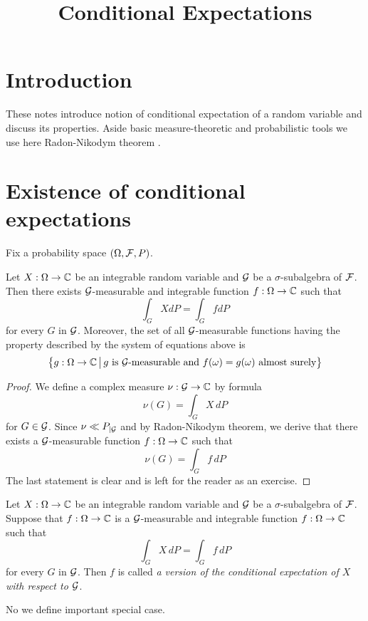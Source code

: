 



\title{Conditional Expectations}
\date{}
\maketitle
\section{Introduction}
These notes introduce notion of conditional expectation of a random variable and discuss its properties. Aside basic measure-theoretic and probabilistic tools we use here Radon-Nikodym theorem {\cite[Theorem 5.1]{Radon_Nikodym_Hahn_Jordan_Lebesgue_decomposition}}.

\section{Existence of conditional expectations}
\noindent
Fix a probability space $(\Omega, {\mathcal F}, P)$.

\begin{theorem}\label{theorem:existenceofconditionalexpectationforintegrable}
Let $X:\Omega \rightarrow {\mathbb C}$ be an integrable random variable and ${\mathcal G}$ be a $\sigma$-subalgebra of ${\mathcal F}$. Then there exists ${\mathcal G}$-measurable and integrable function $f:\Omega \rightarrow {\mathbb C}$ such that
$$\int_GXdP = \int_G f dP$$
for every $G$ in ${\mathcal G}$. Moreover, the set of all ${\mathcal G}$-measurable functions having the property described by the system of equations above is
$$\big\{g:\Omega \rightarrow {\mathbb C}\,\big|\,g\mbox{ is }{\mathcal G}\mbox{-measurable and }f(\omega)=g(\omega)\mbox{ almost surely}\big\}$$
\end{theorem}
\begin{proof}
We define a complex measure $\nu:{\mathcal G}\rightarrow {\mathbb C}$ by formula
$$\nu(G) = \int_G X\,dP$$
for $G\in {\mathcal G}$. Since $\nu \ll P_{\mid {\mathcal G}}$ and by Radon-Nikodym theorem, we derive that there exists a ${\mathcal G}$-measurable function $f:\Omega \rightarrow {\mathbb C}$ such that
$$\nu(G) = \int_G f\,dP$$
The last statement is clear and is left for the reader as an exercise.
\end{proof}

\begin{definition}
Let $X:\Omega \rightarrow {\mathbb C}$ be an integrable random variable and ${\mathcal G}$ be a $\sigma$-subalgebra of ${\mathcal F}$. Suppose that $f:\Omega \rightarrow {\mathbb C}$ is a ${\mathcal G}$-measurable and integrable function $f:\Omega \rightarrow {\mathbb C}$ such that 
$$\int_GX\,dP = \int_G f\, dP$$
for every $G$ in ${\mathcal G}$. Then $f$ is called \textit{a version of the conditional expectation of $X$ with respect to ${\mathcal G}$}.
\end{definition}
\noindent
No we define important special case.

